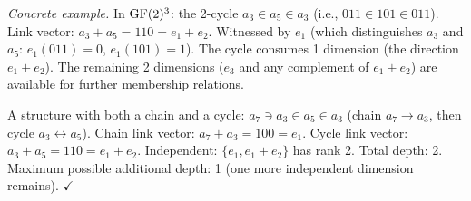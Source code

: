 \emph{Concrete example.}
In $\operatorname{GF}(2)^3$: the 2-cycle $a_3 \in a_5 \in a_3$
(i.e., $011 \in 101 \in 011$). Link vector:
$a_3 + a_5 = 110 = e_1 + e_2$. Witnessed by $e_1$
(which distinguishes $a_3$ and $a_5$: $e_1(011) = 0$,
$e_1(101) = 1$). The cycle consumes 1 dimension
(the direction $e_1 + e_2$). The remaining 2 dimensions
($e_3$ and any complement of $e_1{+}e_2$) are
available for further membership relations.

A structure with both a chain and a cycle:
$a_7 \ni a_3 \in a_5 \in a_3$ (chain $a_7 \to a_3$,
then cycle $a_3 \leftrightarrow a_5$). Chain link
vector: $a_7 + a_3 = 100 = e_1$. Cycle link vector:
$a_3 + a_5 = 110 = e_1 + e_2$. Independent:
$\{e_1, e_1{+}e_2\}$ has rank 2. Total depth: 2.
Maximum possible additional depth: 1 (one more
independent dimension remains). $\checkmark$
